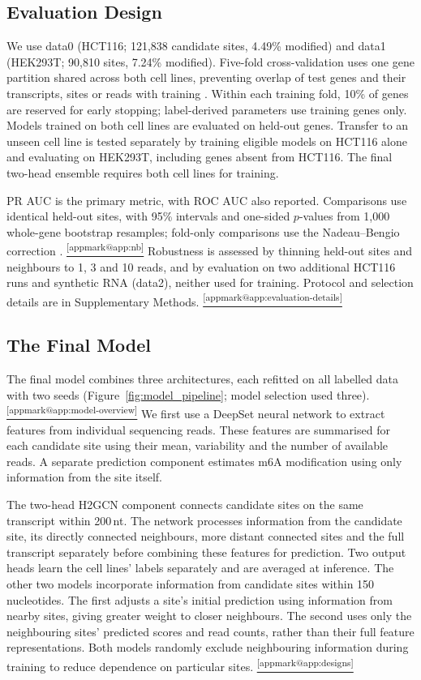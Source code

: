 \documentclass[11pt,a4paper]{article}
\makeatletter
\DeclareRobustCommand{\applink}[1]{%
    \hyperref[#1]{\textsuperscript{\ref*{appmark@#1}}}}
\makeatother
\begin{document}
\subsection{Evaluation Design}
\label{sec:data}
We use data0 (HCT116; 121,838 candidate sites, 4.49\% modified) and data1
(HEK293T; 90,810 sites, 7.24\% modified).
Five-fold cross-validation uses one gene partition shared across both cell
lines, preventing overlap of test genes and their transcripts, sites or reads
with training \citep{bbag434}. Within each training fold, 10\% of genes are
reserved for early stopping; label-derived parameters use training genes only.
Models trained on both cell lines are evaluated on held-out genes. Transfer
to an unseen cell line is tested separately by training eligible models on
HCT116 alone and evaluating on HEK293T, including genes absent from
HCT116. The final two-head ensemble requires both cell lines for training.

PR AUC is the primary metric, with ROC AUC also reported. Comparisons use
identical held-out sites, with 95\% intervals and one-sided $p$-values from
1,000 whole-gene bootstrap resamples; fold-only comparisons use the
Nadeau--Bengio correction \citep{nadeau2003}.\applink{app:nb}
Robustness is assessed by thinning held-out sites and neighbours to 1, 3 and
10 reads, and by evaluation on two additional HCT116 runs and synthetic RNA
(data2), neither used for training. Protocol and selection details are in
Supplementary Methods.\applink{app:evaluation-details}

\subsection{The Final Model}
\label{sec:model}
The final model combines three architectures, each refitted on all labelled
data with two seeds (Figure~\ref{fig:model_pipeline}; model selection used three).\applink{app:model-overview} We first use a DeepSet neural network
\citep{zaheer2017} to extract features from individual sequencing reads. These features are summarised for each candidate site using their mean, variability and the number of available reads. A separate prediction component estimates m6A modification using only information from the site itself.

The two-head H2GCN component \citep{zhu2020} connects candidate sites on the
same transcript within 200\,nt. The network processes information from the candidate site, its directly connected neighbours, more distant connected sites and the full transcript separately before combining these features for prediction. Two output heads learn the cell lines' labels separately and
are averaged at inference. The other two models incorporate information from candidate sites within 150 nucleotides. The first adjusts a site's initial prediction using information from nearby sites, giving greater weight to closer neighbours. The second uses only the neighbouring sites' predicted scores and read counts, rather than their full feature representations. Both models randomly exclude neighbouring information during training to reduce dependence on particular sites.\applink{app:designs}
\end{document}
